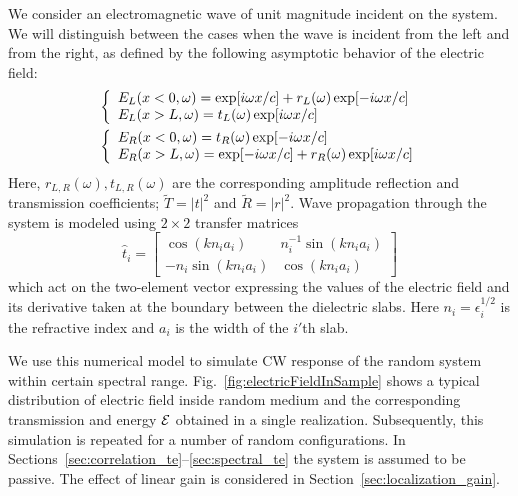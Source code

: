 We consider an electromagnetic wave of unit magnitude incident on the system. We will distinguish between the cases when the wave is incident from the left and from the right, as defined by the following asymptotic behavior of the electric field:
\begin{eqnarray}
&\left\{
\begin{array}{l l}
E_L(x<0,\omega)=\exp[i\omega x/c]+r_L(\omega)\exp[-i\omega x/c]\\
E_L(x>L,\omega)=t_L(\omega)\exp[i\omega x/c]\\
\end{array} \right. \label{eq:basis_functions_bc_l}\\
&\left\{
\begin{array}{l l}
E_R(x<0,\omega)=t_R(\omega)\exp[-i\omega x/c]\\
E_R(x>L,\omega)=\exp[-i\omega x/c]+r_R(\omega)\exp[i\omega x/c]\\
\end{array} \right. \label{eq:basis_functions_bc_r}
\end{eqnarray}
Here, $r_{L,R}(\omega),t_{L,R}(\omega)$ are the corresponding amplitude reflection and transmission coefficients; $\tilde{T}=\left|t\right|^2$ and $\tilde{R}=\left|r\right|^2$. Wave propagation through the system is modeled using $2\times 2$ transfer matrices\cite{1994_Pendry,2005_Yeh_book,2004_Mello_Kumar_book} 
\begin{equation}
\widehat{t}_i=\left[
\begin{array}{cc}
\cos(k n_i a_i) & n_i^{-1}\sin(k n_i a_i) \\
-n_i \sin(k n_i a_i) & \cos(k n_i a_i)
\end{array}
\right]
\label{eq:transfer_matrix}
\end{equation}
which act on the two-element vector expressing the values of the electric field and its derivative taken at the boundary between the dielectric slabs. Here $n_i=\epsilon_i^{1/2}$ is the refractive index and $a_i$ is the width of the $i'$th slab.

We use this numerical model to simulate CW response of the random system within  certain spectral range. Fig.~\ref{fig:electricFieldInSample} shows a typical distribution of electric field inside random medium and the corresponding transmission and energy ${\cal E}$ obtained in a single realization. Subsequently, this simulation is repeated for a number of random configurations. In Sections~\ref{sec:correlation_te}--\ref{sec:spectral_te} the system is assumed to be passive. The effect of linear gain is considered in Section~\ref{sec:localization_gain}.

